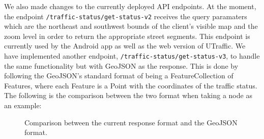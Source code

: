 We also made changes to the currently deployed API endpoints. At the moment, the endpoint \lstinline{/traffic-status/get-status-v2} receives the query paramaters which are the northeast and southwest bounds of the client's visible map and the zoom level in order to return the appropriate street segments. This endpoint is currently used by the Android app as well as the web version of UTraffic. We have implemented another endpoint, \lstinline{/traffic-status/get-status-v3}, to handle the same functionality but with GeoJSON as the response. This is done by following the GeoJSON's standard format of being a FeatureCollection of Features, where each Feature is a Point with the coordinates of the traffic status. The following is the comparison between the two format when taking a node as an example:

\begin{figure}[H]
    \centering
    \hspace{0.5cm} %
    \caption{Comparison between the current response format and the GeoJSON format.}
\end{figure}

